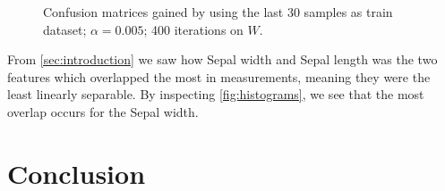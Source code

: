 \documentclass{article}
\begin{document}
\begin{figure}
    \centering
    \qquad
    \caption{Confusion matrices gained by using the last 30 samples as train dataset;%
    $\alpha = 0.005$; 400 iterations on $W$.}\label{fig:CM_30_last}
\end{figure}

From \autoref{sec:introduction} we saw how Sepal width and Sepal length was the two features which overlapped
the most in measurements, meaning they were the least linearly separable. By inspecting \autoref{fig:histograms},
we see that the most overlap occurs for the Sepal width.

\section{Conclusion}
\end{document}
